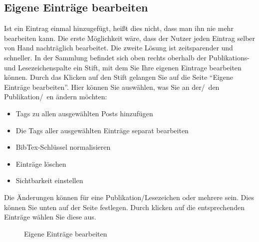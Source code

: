 \subsection{Eigene Einträge bearbeiten}
Ist ein Eintrag einmal hinzugefügt, heißt dies nicht, dass man ihn nie mehr bearbeiten kann. Die erste Möglichkeit wäre, dass der Nutzer jeden Eintrag selber von Hand nachträglich bearbeitet. Die zweite Lösung ist zeitsparender und schneller.\newline
In der Sammlung befindet sich oben rechts oberhalb der Publikations- und Lesezeichenspalte ein Stift, mit dem Sie Ihre eigenen Eintrage bearbeiten können. Durch das Klicken auf den Stift gelangen Sie auf die Seite \enquote{Eigene Einträge bearbeiten}. Hier können Sie auswählen, was Sie an der/~den Publikation/~en ändern möchten:
\begin{itemize}
\item Tags zu allen ausgewählten Posts hinzufügen
\item Die Tags aller ausgewählten Einträge separat bearbeiten
\item BibTex-Schlüssel normalisieren
\item Einträge löschen
\item Sichtbarkeit einstellen
\end{itemize}
Die Änderungen können für eine Publikation/Lesezeichen oder mehrere sein. Dies können Sie unten auf der Seite festlegen. Durch klicken auf die entsprechenden Einträge wählen Sie diese aus.
\begin{figure}[h!]
 \centering
 \caption{Eigene Einträge bearbeiten}
 \label{figure030}
\end{figure}
